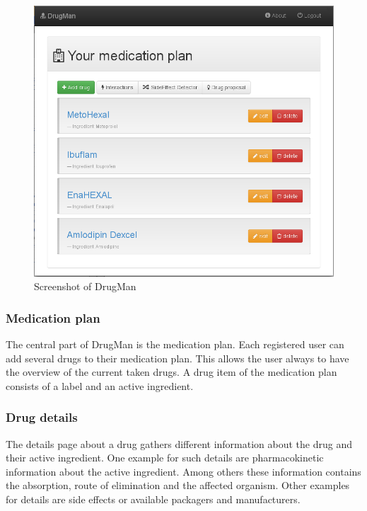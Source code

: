 \begin{figure}
  \centering
  \includegraphics[scale=0.38]{evaluation/drugman}
  \caption{Screenshot of DrugMan}
  \label{fig:drugman}
\end{figure}

\subsubsection*{Medication plan}
The central part of DrugMan is the medication plan.
Each registered user can add several drugs to their medication plan.
This allows the user always to have the overview of the current taken drugs.
A drug item of the medication plan consists of a label and an active ingredient.

\subsubsection*{Drug details}
The details page about a drug gathers different information about the drug and their active ingredient.
One example for such details are pharmacokinetic information about the active ingredient. 
Among others these information contains the absorption, route of elimination and the affected organism.
Other examples for details are side effects or available packagers and manufacturers.

